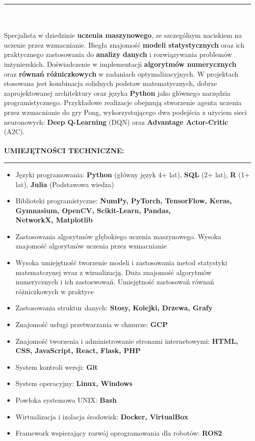 \documentclass[10pt]{article}
\newcommand{\longline}{\rule{19.6cm}{1pt}}
\begin{document}
\noindent \longline 
\\ \\
\noindent Specjalista w dziedzinie \textbf{uczenia maszynowego}, ze szczególnym naciskiem na uczenie przez wzmacnianie.
Biegła znajomość \textbf{modeli statystycznych} oraz ich praktycznego zastosowania do \textbf{analizy danych} i rozwiązywania problemów inżynierskich.
Doświadczenie w implementacji \textbf{algorytmów numerycznych} oraz \textbf{równań różniczkowych} w zadaniach optymalizacyjnych.
W projektach stosowana jest kombinacja solidnych podstaw matematycznych, dobrze zaprojektowanej architektury oraz języka \textbf{Python} jako głównego narzędzia programistycznego. 
Przykładowe realizacje obejmują stworzenie agenta uczenia przez wzmacnianie do gry Pong, wykorzystującego dwa podejścia z użyciem sieci neuronowych: \textbf{Deep Q-Learning} (DQN) oraz \textbf{Advantage Actor-Critic} (A2C).
\\ \\
\noindent \fontsize{14pt}{14pt}\selectfont \textbf{\color{Violet}UMIEJĘTNOŚCI TECHNICZNE:}
\fontsize{10pt}{10pt}\selectfont 
\\ 
\noindent \longline 
\begin{itemize}[leftmargin=*, parsep=0.5pt]
    \item Języki programowania: \textbf{Python} (główny język 4+ lat), \textbf{SQL} (2+ lat), \textbf{R} (1+ lat), \textbf{Julia} (Podstawowa wiedza)
    \item Biblioteki programistyczne: \textbf{NumPy, PyTorch, TensorFlow, Keras, Gymnasium, OpenCV, Scikit-Learn, Pandas, \\ NetworkX, Matplotlib}
    \item Zastosowania algorytmów głębokiego uczenia maszynowego. Wysoka znajomość algorytmów uczenia przez wzmacnianie
    \item Wysoka umiejętność tworzenie modeli i zastosowania metod statystyki matematczynej wraz z wizualizacją. 
    Duża znajomość algorytmów numerycznych i ich zastoswowań. Umiejętność zastosowań równań różniczkowych w praktyce
    \item Zastosowania struktur danych: \textbf{Stosy, Kolejki, Drzewa, Grafy}
    \item Znajomość usługi przetwarzania w chmurze: \textbf{GCP}
    \item Znajomość tworzenia i administrowanie stronami internetowymi: \textbf{HTML, CSS, JavaScript, React, Flask, PHP}
    \item System kontroli wersji: \textbf{Git}
    \item System operacyjny: \textbf{Linux, Windows}
    \item Powłoka systemowa UNIX: \textbf{Bash} 
    \item Wirtualizacja i izolacja środowisk: \textbf{Docker, VirtualBox}
    \item Framework wspierający rozwój oprogramowania dla robotów: \textbf{ROS2}
\end{itemize}
\end{document}
